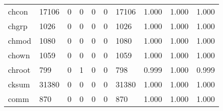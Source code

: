 \begin{longtable}{lp{1.3cm}p{1.3cm}p{1.3cm}p{1.3cm}p{1.3cm}p{1.3cm}p{1.3cm}p{1.3cm}p{1.3cm}}
chcon     &                  17106 &                                  0 &                                 0 &                                0 &                                 0 &                           17106 &                                1.000 &                                  1.000 &                                1.000 \\
chgrp     &                   1026 &                                  0 &                                 0 &                                0 &                                 0 &                            1026 &                                1.000 &                                  1.000 &                                1.000 \\
chmod     &                   1080 &                                  0 &                                 0 &                                0 &                                 0 &                            1080 &                                1.000 &                                  1.000 &                                1.000 \\
chown     &                   1059 &                                  0 &                                 0 &                                0 &                                 0 &                            1059 &                                1.000 &                                  1.000 &                                1.000 \\
chroot    &                    799 &                                  0 &                                 1 &                                0 &                                 0 &                             798 &                                0.999 &                                  1.000 &                                0.999 \\
cksum     &                  31380 &                                  0 &                                 0 &                                0 &                                 0 &                           31380 &                                1.000 &                                  1.000 &                                1.000 \\
comm      &                    870 &                                  0 &                                 0 &                                0 &                                 0 &                             870 &                                1.000 &                                  1.000 &                                1.000 \\

\end{longtable}
